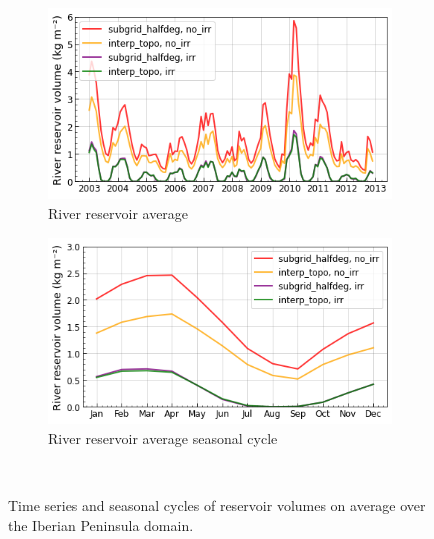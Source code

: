 \begin{figure}[htbp]
    \begin{subfigure}[b]{0.48\textwidth}
        \caption{River reservoir average}
        \includegraphics[width=\textwidth]{images/chap3/time_series/streamr_time_series.png}
    \end{subfigure} 
    \begin{subfigure}[b]{0.48\textwidth}
        \caption{River reservoir average seasonal cycle}
        \includegraphics[width=\textwidth]{images/chap3/time_series/streamr_seasonal_cycle.png}
    \end{subfigure} \\

    \caption{Time series and seasonal cycles of reservoir volumes on average over the Iberian Peninsula domain.}
    \label{fig:reservoir_time_series}
\end{figure}

